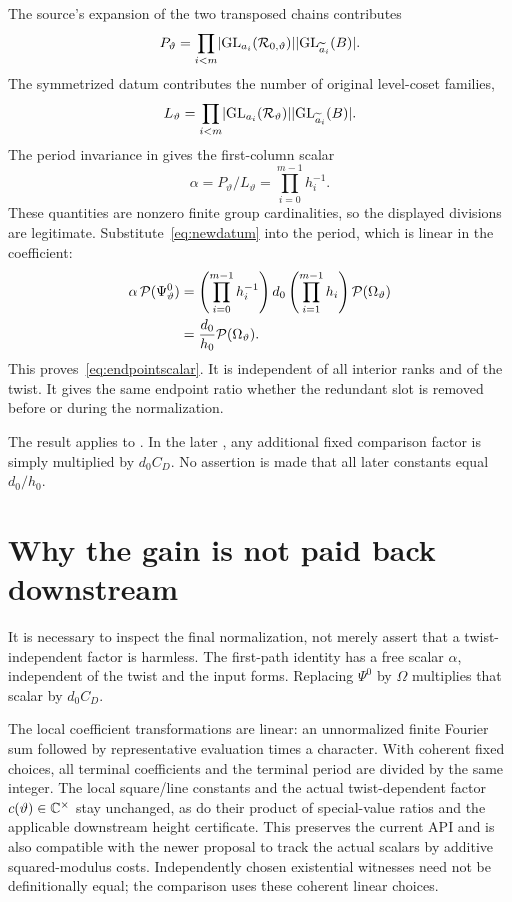 The source's expansion of the two transposed chains contributes
\[
 P_\vartheta=
 \prod_{i<m}\lvert \operatorname{GL}_{a_i}(\mathcal R_{0,\vartheta})\rvert
                  \lvert \operatorname{GL}_{\widetilde a_i}(B)\rvert.
\]
The symmetrized datum contributes the number of original level-coset families,
\[
 L_\vartheta=
 \prod_{i<m}\lvert \operatorname{GL}_{a_i}(\mathcal R_\vartheta)\rvert
                  \lvert \operatorname{GL}_{\widetilde a_i}(B)\rvert.
\]
The period invariance in  gives the first-column scalar
\begin{equation}\label{eq:alphaprod}
 \alpha=P_\vartheta/L_\vartheta=\prod_{i=0}^{m-1}h_i^{-1}.
\end{equation}
These quantities are nonzero finite group cardinalities, so the displayed divisions are legitimate. Substitute~\eqref{eq:newdatum} into the period, which is linear in the coefficient:
\begin{align*}
 \alpha\,\mathcal P(\Psi^0_\vartheta)
 &=\left(\prod_{i=0}^{m-1}h_i^{-1}\right)
       d_0\left(\prod_{i=1}^{m-1}h_i\right)\mathcal P(\Omega_\vartheta)\\
 &=\frac{d_0}{h_0}\mathcal P(\Omega_\vartheta).
\end{align*}
This proves~\eqref{eq:endpointscalar}. It is independent of all interior ranks and of the twist. It gives the same endpoint ratio whether the redundant slot is removed before or during the normalization.

The result applies to . In the later , any additional fixed comparison factor is simply multiplied by $d_0C_D$. No assertion is made that all later constants equal $d_0/h_0$.

\section{Why the gain is not paid back downstream}
\label{sec:downstream}

It is necessary to inspect the final normalization, not merely assert that a twist-independent factor is harmless. The first-path identity has a free scalar $\alpha$, independent of the twist and the input forms. Replacing $\Psi^0$ by $\Omega$ multiplies that scalar by $d_0C_D$.

The local coefficient transformations are linear: an unnormalized finite Fourier sum followed by representative evaluation times a character. With coherent fixed choices, all terminal coefficients and the terminal period are divided by the same integer. The local square/line constants and the actual twist-dependent factor $c(\vartheta)\in\mathbb C^\times$ stay unchanged, as do their product of special-value ratios and the applicable downstream height certificate. This preserves the current  API and is also compatible with the newer proposal to track the actual scalars by additive squared-modulus costs. Independently chosen existential witnesses need not be definitionally equal; the comparison uses these coherent linear choices.

